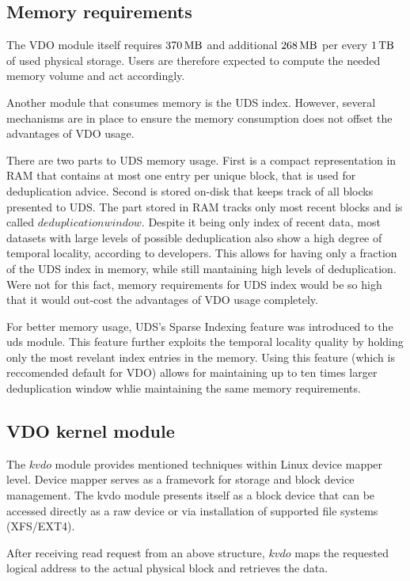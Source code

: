 \documentclass[
  color, %
  table, %
  lof,   %
  lot,   %
]{fithesis3}
\begin{document}
\subsection{Memory requirements}
The VDO module itself requires $\SI{370}{\mega\byte}$ and additional $\SI{268}{\mega\byte}$ per every $\SI{1}{\tera\byte}$ of used physical storage. Users are therefore expected to compute the needed memory volume and act accordingly.

Another module that consumes memory is the UDS index. However, several mechanisms are in place to ensure the memory consumption does not offset the advantages of VDO usage.

There are two parts to UDS memory usage. First is a compact representation in RAM that contains at most one entry per unique block, that is used for deduplication advice. Second is stored on-disk that keeps track of all blocks presented to UDS. The part stored in RAM tracks only most recent blocks and is called $deduplication window$. Despite it being only index of recent data, most datasets with large levels of possible deduplication also show a high degree of temporal locality, according to developers. This allows for having only a fraction of the UDS index in memory, while still mantaining high levels of deduplication. Were not for this fact, memory requirements for UDS index would be so high that it would out-cost the advantages of VDO usage completely.

For better memory usage, UDS's Sparse Indexing feature was introduced to the uds module. This feature further exploits the temporal locality quality by holding only the most revelant index entries in the memory. Using this feature (which is reccomended default for VDO) allows for maintaining up to ten times larger deduplication window whlie maintaining the same memory requirements.

\subsection{VDO kernel module}
The $kvdo$ module provides mentioned techniques within Linux device mapper level. Device mapper serves as a framevork for storage and block device management. The kvdo module presents itself as a block device that can be accessed directly as a raw device or via installation of supported file systems (XFS/EXT4). 

After receiving read request from an above structure, $kvdo$ maps the requested logical address to the actual physical block and retrieves the data.
\end{document}

